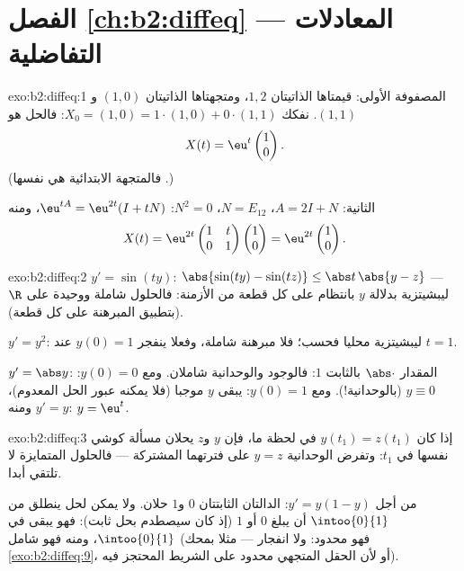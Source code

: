 \section*{الفصل \ref{ch:b2:diffeq} --- المعادلات التفاضلية}

\begin{solution}{exo:b2:diffeq:1}
المصفوفة الأولى: قيمتاها الذاتيتان $1, 2$، ومتجهتاها الذاتيتان $(1,0)$
و$(1,1)$. نفكك $X_0 = (1,0) = 1\cdot(1,0) + 0\cdot(1,1)$: فالحل هو
\[
X(t) = \eu^{t}\begin{pmatrix}1\\ 0\end{pmatrix} .
\]
(فالمتجهة الابتدائية هي نفسها .)

الثانية: $A = 2I + N$، $N = E_{12}$، $N^2 = 0$: $\eu^{tA} =
\eu^{2t}(I + tN)$، ومنه
\[
X(t) = \eu^{2t}\begin{pmatrix} 1 & t\\ 0 & 1\end{pmatrix}
\begin{pmatrix}1\\ 0\end{pmatrix}
= \eu^{2t}\begin{pmatrix}1\\ 0\end{pmatrix}.
\]
\end{solution}

\begin{solution}{exo:b2:diffeq:2}
$y' = \sin(ty)$: $\abs{\sin(ty) - \sin(tz)} \leq \abs t\,\abs{y -
z}$ --- ليبشيتزية بدلالة $y$ بانتظام على كل قطعة من
الأزمنة: فالحلول شاملة ووحيدة على $\R$ (بتطبيق المبرهنة على كل
قطعة).

$y' = y^2$: ليبشيتزية محليا فحسب؛ فلا مبرهنة شاملة، وفعلا ينفجر $y(0) = 1$
عند $t = 1$.

$y' = \abs y$: المقدار $\abs\cdot$  بالثابت $1$: فالوجود والوحدانية
شاملان. ومع $y(0) = 0$: $y \equiv 0$ (بالوحدانية!). ومع $y(0)
= 1$: يبقى $y$
موجبا (فلا يمكنه عبور الحل المعدوم)، ومنه $y' =
y$: $y = \eu^t$.
\end{solution}

\begin{solution}{exo:b2:diffeq:3}
إذا كان $y(t_1) = z(t_1)$ في لحظة ما، فإن $y$ و$z$ يحلان مسألة كوشي نفسها
في $t_1$: وتفرض الوحدانية $y = z$ على فترتهما المشتركة --- فالحلول
المتمايزة لا تلتقي أبدا.

من أجل $y' = y(1-y)$: الدالتان الثابتتان $0$ و$1$ حلان. ولا يمكن لحل
ينطلق من $\intoo{0}{1}$ أن يبلغ $0$ أو $1$ (إذ كان سيصطدم بحل ثابت): فهو
يبقى في $\intoo{0}{1}$، ومنه فهو شامل (فهو محدود: ولا انفجار --- مثلا بمحك
\cref{exo:b2:diffeq:9}، أو لأن الحقل المتجهي محدود على الشريط المحتجز فيه).
\end{solution}

